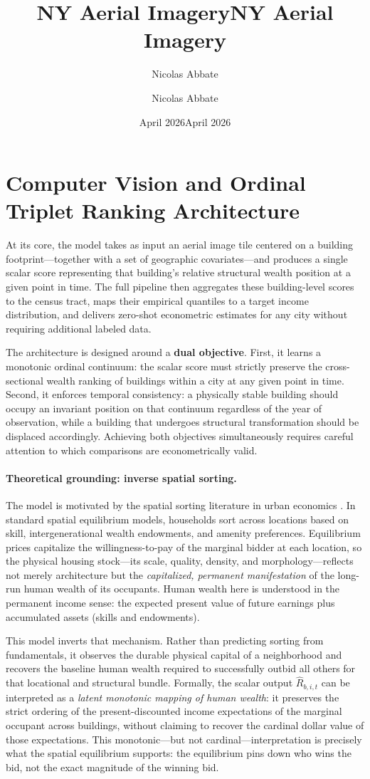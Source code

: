 \documentclass{article}
\title{NY Aerial Imagery}
\author{Nicolas Abbate}
\date{April 2026}
\title{NY Aerial Imagery}
\author{Nicolas Abbate}
\date{April 2026}
\begin{document}
\section{Computer Vision and Ordinal Triplet Ranking Architecture}

At its core, the model takes as input an aerial image tile centered on a building footprint---together with a set of geographic covariates---and produces a single scalar score representing that building's relative structural wealth position at a given point in time. The full pipeline then aggregates these building-level scores to the census tract, maps their empirical quantiles to a target income distribution, and delivers zero-shot econometric estimates for any city without requiring additional labeled data.

The architecture is designed around a \textbf{dual objective}. First, it learns a monotonic ordinal continuum: the scalar score must strictly preserve the cross-sectional wealth ranking of buildings within a city at any given point in time. Second, it enforces temporal consistency: a physically stable building should occupy an invariant position on that continuum regardless of the year of observation, while a building that undergoes structural transformation should be displaced accordingly. Achieving both objectives simultaneously requires careful attention to which comparisons are econometrically valid.

\paragraph{Theoretical grounding: inverse spatial sorting.}
The model is motivated by the spatial sorting literature in urban economics \citep{ahlfeldt2015economics, diamond2016determinants}. In standard spatial equilibrium models, households sort across locations based on skill, intergenerational wealth endowments, and amenity preferences. Equilibrium prices capitalize the willingness-to-pay of the marginal bidder at each location, so the physical housing stock---its scale, quality, density, and morphology---reflects not merely architecture but the \textit{capitalized, permanent manifestation} of the long-run human wealth of its occupants. Human wealth here is understood in the permanent income sense: the expected present value of future earnings plus accumulated assets (skills and endowments).

This model inverts that mechanism. Rather than predicting sorting from fundamentals, it observes the durable physical capital of a neighborhood and recovers the baseline human wealth required to successfully outbid all others for that locational and structural bundle. Formally, the scalar output $\hat{R}_{b,i,t}$ can be interpreted as a \textit{latent monotonic mapping of human wealth}: it preserves the strict ordering of the present-discounted income expectations of the marginal occupant across buildings, without claiming to recover the cardinal dollar value of those expectations. This monotonic---but not cardinal---interpretation is precisely what the spatial equilibrium supports: the equilibrium pins down who wins the bid, not the exact magnitude of the winning bid.
\end{document}
